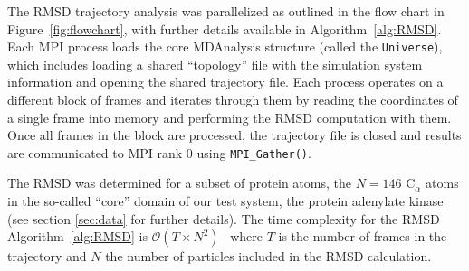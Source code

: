 The RMSD trajectory analysis was parallelized as outlined in the flow chart in Figure~\ref{fig:flowchart}, with further details available in Algorithm~\ref{alg:RMSD}.
Each MPI process loads the core MDAnalysis structure (called the \texttt{Universe}), which includes loading a shared ``topology'' file with the simulation system information and opening the shared trajectory file.
Each process operates on a different block of frames and iterates through them by reading the coordinates of a single frame into memory and performing the RMSD computation with them.
Once all frames in the block are processed, the trajectory file is closed and results are communicated to MPI rank 0 using \texttt{MPI\_Gather()}.

The RMSD was determined for a subset of protein atoms, the $N=146$  C$_{\alpha}$ atoms in the so-called ``core'' domain of our test system, the protein adenylate kinase \cite{Seyler:2014il} (see section \ref{sec:data} for further details).
The time complexity for the RMSD Algorithm~\ref{alg:RMSD} is $\mathcal{O}(T \times N^{2})$~\cite{Liu:2010kx} where $T$ is the number of frames in the trajectory and $N$ the number of particles included in the RMSD calculation.

